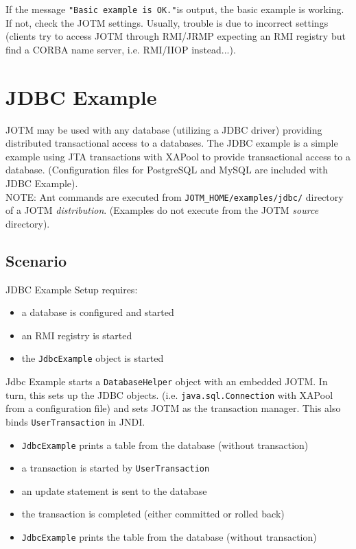 \documentclass[a4paper,11pt]{article}
\begin{document}
\noindent If the message \texttt{"Basic example is OK."}is output, the
basic example is working. If not, check the JOTM
settings. Usually, trouble is due to incorrect settings
(clients try to access JOTM through RMI/JRMP expecting an RMI registry
 but find a CORBA name server, i.e. RMI/IIOP instead...).

\section{JDBC Example}
\label{sec:jdbc_example}

JOTM may be used with any database (utilizing a JDBC driver) providing
distributed transactional access to a databases.\newline
The JDBC example is a simple example using JTA
transactions with XAPool to provide transactional access to a database.
(Configuration files for PostgreSQL and MySQL are included with JDBC Example).\\

\noindent NOTE: Ant commands are executed from \texttt{JOTM\_HOME/examples/jdbc/}
directory of a JOTM \emph{distribution}. (Examples do not execute from the JOTM
\emph{source} directory). 

\subsection{Scenario}
\label{sec:jdbc_scenario}

JDBC Example Setup requires:
\begin{itemize}
\item a database is configured and started 
\item an RMI registry is started
\item the \texttt{JdbcExample} object is started
\end{itemize}
\noindent Jdbc Example starts a \texttt{DatabaseHelper} object with an embedded JOTM.
In turn, this sets up the JDBC objects. (i.e. \texttt{java.sql.Connection} with XAPool
from a configuration file) and sets JOTM as the transaction manager. This also binds
 \texttt{UserTransaction} in JNDI.
\begin{itemize}
\item \texttt{JdbcExample} prints a table from the database (without
  transaction)
\item a transaction is started by \texttt{UserTransaction}
\item an update statement is sent to the database
\item the transaction is completed (either committed or rolled back)
\item \texttt{JdbcExample} prints the table from the database (without
  transaction)  
\end{itemize}
\end{document}

